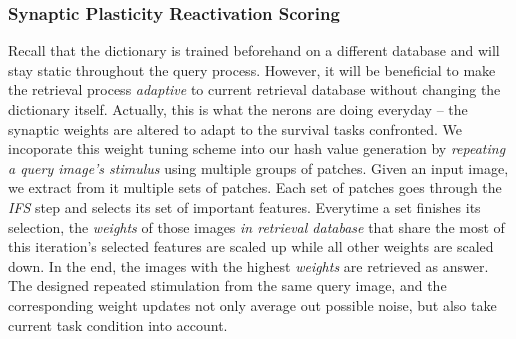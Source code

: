 \documentclass[letterpaper]{article}
\begin{document}
\subsubsection{Synaptic Plasticity Reactivation Scoring}
Recall that the dictionary is trained beforehand on a different database and will stay static throughout the query process. However, it will be beneficial to make the retrieval process \emph{adaptive} to current retrieval database without changing the dictionary itself. Actually, this is what the nerons are doing everyday -- the synaptic weights are altered to adapt to the survival tasks confronted. We incoporate this weight tuning scheme into our hash value generation by \emph{repeating a query image's stimulus} using multiple groups of patches.
Given an input image, we extract from it multiple sets of patches. Each set of patches goes through the \emph{IFS} step and selects its set of important features. Everytime a set finishes its selection, the \emph{weights} of those images \emph{in retrieval database} that share the most of this iteration's selected features are scaled up while all other weights are scaled down. In the end, the images with the highest \emph{weights} are retrieved as answer.
The designed repeated stimulation from the same query image, and the corresponding weight updates not only average out possible noise, but also take current task condition into account.
\end{document}

